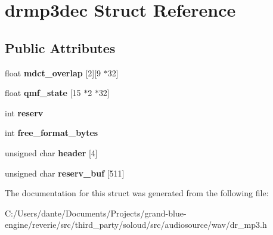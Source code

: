 \hypertarget{structdrmp3dec}{}\section{drmp3dec Struct Reference}
\label{structdrmp3dec}
\subsection*{Public Attributes}
\begin{DoxyCompactItemize}
\item 
\mbox{\label{structdrmp3dec_aa3a8b3465682a3ab6bd800341617ee7e}} 
float {\bfseries mdct\+\_\+overlap} \mbox{[}2\mbox{]}\mbox{[}9 $\ast$32\mbox{]}
\item 
\mbox{\label{structdrmp3dec_ad3cb6c01e5deee7e05264f61b9b9a5cc}} 
float {\bfseries qmf\+\_\+state} \mbox{[}15 $\ast$2 $\ast$32\mbox{]}
\item 
\mbox{\label{structdrmp3dec_a81df7d1c59e3ce43b7512fe06f4a7630}} 
int {\bfseries reserv}
\item 
\mbox{\label{structdrmp3dec_a3d9913952fef5b67f9c064d56650cd1e}} 
int {\bfseries free\+\_\+format\+\_\+bytes}
\item 
\mbox{\label{structdrmp3dec_a811e462c57ef91949de222952f154667}} 
unsigned char {\bfseries header} \mbox{[}4\mbox{]}
\item 
\mbox{\label{structdrmp3dec_a747a73b6f0b3b479f18fc65fc04a2313}} 
unsigned char {\bfseries reserv\+\_\+buf} \mbox{[}511\mbox{]}
\end{DoxyCompactItemize}


The documentation for this struct was generated from the following file\+:\begin{DoxyCompactItemize}
\item 
C\+:/\+Users/dante/\+Documents/\+Projects/grand-\/blue-\/engine/reverie/src/third\+\_\+party/soloud/src/audiosource/wav/dr\+\_\+mp3.\+h\end{DoxyCompactItemize}
